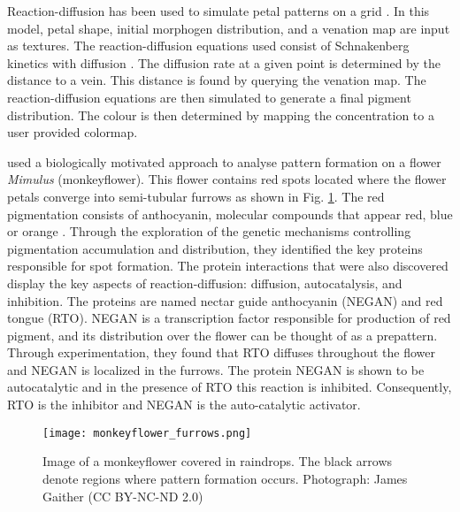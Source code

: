 Reaction-diffusion has been used to simulate petal patterns on a grid \citep{Zhou2007}. In this model, petal shape, initial morphogen distribution, and a venation map are input as textures. The reaction-diffusion equations used consist of Schnakenberg kinetics with diffusion \citep{schnakenberg1979}. The diffusion rate at a given point is determined by the distance to a vein. This distance is found by querying the venation map. The reaction-diffusion equations are then simulated to generate a final pigment distribution. The colour is then determined by mapping the concentration to a user provided colormap.

\citep{Yuan2019} used a biologically motivated approach to analyse pattern formation on a flower \textit{Mimulus} (monkeyflower). This flower contains red spots located where the flower petals converge into semi-tubular furrows as shown in Fig. \ref{fig:monkeyflower_real}. The red pigmentation consists of anthocyanin, molecular compounds that appear red, blue or orange \citep{bayer1966}. Through the exploration of the genetic mechanisms controlling pigmentation accumulation and distribution, they identified the key proteins responsible for spot formation. The protein interactions that were also discovered display the key aspects of reaction-diffusion: diffusion, autocatalysis, and inhibition. The proteins are named nectar guide anthocyanin (NEGAN) and red tongue (RTO). NEGAN is a transcription factor responsible for production of red pigment, and its distribution over the flower can be thought of as a prepattern. Through experimentation, they found that RTO diffuses throughout the flower and NEGAN is localized in the furrows. The protein NEGAN is shown to be autocatalytic and in the presence of RTO this reaction is inhibited. Consequently, RTO is the inhibitor and NEGAN is the auto-catalytic activator.

\begin{figure}[ht]
	\centering
	\texttt{[image: monkeyflower\_furrows.png]}
	\caption{Image of a monkeyflower covered in raindrops. The black arrows denote regions where pattern formation occurs. \textcolor{citation-gray}{Photograph: James Gaither (CC BY-NC-ND 2.0)}}
	\label{fig:monkeyflower_real}
\end{figure}

